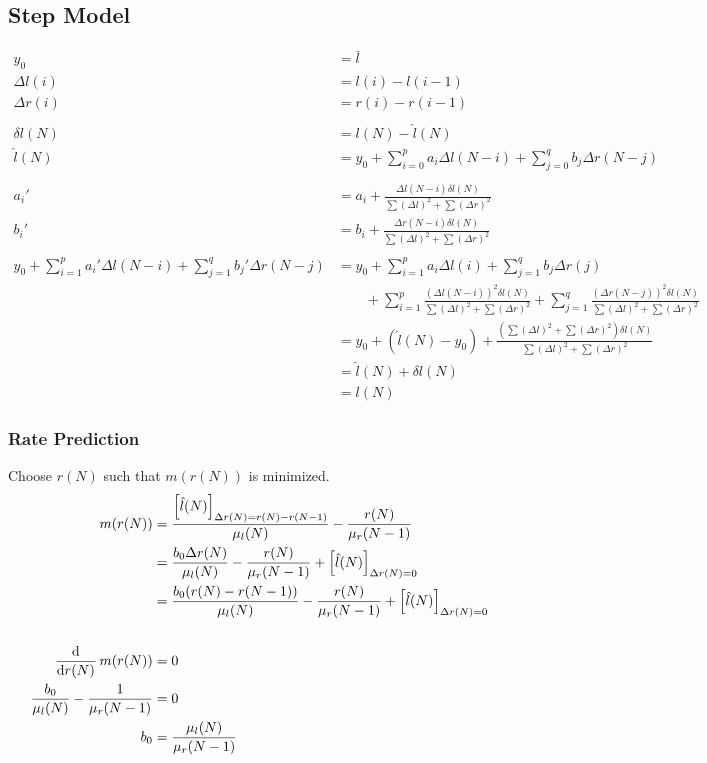 \documentclass[12pt]{article}
\begin{document}
\subsection{Step Model}

\begin{align*}
    y_0 &= \bar{l}\\
    \Delta l(i) &= l(i) - l(i - 1)\\
    \Delta r(i) &= r(i) - r(i - 1)\\
    \\
    \delta{l}(N) &= l(N) - \hat{l}(N)\\
    \hat{l}(N) &= y_0 + \sum_{i = 0}^p a_i \Delta l(N - i) + \sum_{j = 0}^q b_j \Delta r(N - j)\\
    \\
    a_i' &= a_i + \frac{\Delta l(N - i) \delta{l}(N)}{\sum (\Delta l)^2 + \sum (\Delta r)^2}\\
    b_i' &= b_i + \frac{\Delta r(N - i) \delta{l}(N)}{\sum (\Delta l)^2 + \sum (\Delta r)^2}\\
    \\
    y_0 +
    \sum_{i = 1}^p a_i' \Delta l(N - i) + \sum_{j = 1}^q b_j' \Delta r(N - j)
    &= y_0 +
    \sum_{i = 1}^p a_i \Delta l(i) + \sum_{j = 1}^q b_j \Delta r(j)\\
    &\qquad + \sum_{i = 1}^p \frac{(\Delta l(N - i))^2 \delta{l}(N)}{\sum (\Delta l)^2 + \sum (\Delta r)^2}
    + \sum_{j = 1}^q \frac{(\Delta r(N - j))^2 \delta{l}(N)}{\sum (\Delta l)^2 + \sum (\Delta r)^2}\\
    &= y_0 + (\hat{l}(N) - y_0)
    + \frac{(\sum (\Delta l)^2 + \sum (\Delta r)^2) \delta{l}(N)}{\sum (\Delta l)^2 + \sum (\Delta r)^2}\\
    &= \hat{l}(N) + \delta{l}(N)\\
    &= l(N)
\end{align*}

\subsubsection{Rate Prediction}

Choose $r(N)$ such that $m(r(N))$ is minimized.
\begin{align*}
    m(r(N)) &=\frac{\sbr{\hat{l}(N)}_{\Delta r(N) = r(N) - r(N - 1)}}{\mu_l(N)} - \frac{r(N)}{\mu_r(N - 1)}\\
    &= \frac{b_0 \Delta r(N)}{\mu_l(N)} - \frac{r(N)}{\mu_r(N - 1)}
    + \sbr{\hat{l}(N)}_{\Delta r(N) = 0}\\
    &= \frac{b_0 (r(N) - r(N - 1))}{\mu_l(N)} - \frac{r(N)}{\mu_r(N - 1)}
    + \sbr{\hat{l}(N)}_{\Delta r(N) = 0}\\
    \\
    \dod{}{r(N)} m(r(N)) &= 0\\
    \frac{b_0}{\mu_l(N)} - \frac{1}{\mu_r(N - 1)} &= 0\\
    b_0 &= \frac{\mu_l(N)}{\mu_r(N - 1)}\\
\end{align*}
\end{document}
